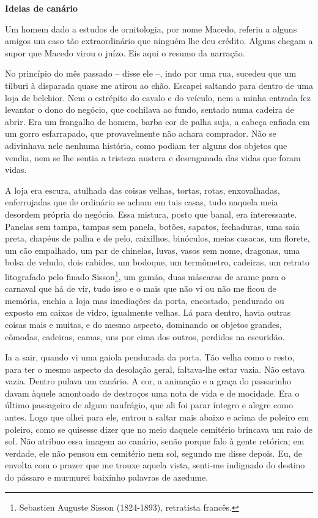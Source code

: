 \textbf{Ideias de canário}

Um homem dado a estudos de ornitologia, por nome Macedo, referiu a
alguns amigos um caso tão extraordinário que ninguém lhe deu crédito.
Alguns chegam a supor que Macedo virou o juízo. Eis aqui o resumo da
narração.

No princípio do mês passado -- disse ele --, indo por uma rua, sucedeu
que um tílburi à disparada quase me atirou ao chão. Escapei saltando
para dentro de uma loja de belchior. Nem o estrépito do cavalo e do
veículo, nem a minha entrada fez levantar o dono do negócio, que
cochilava ao fundo, sentado numa cadeira de abrir. Era um frangalho de
homem, barba cor de palha suja, a cabeça enfiada em um gorro
esfarrapado, que provavelmente não achara comprador. Não se adivinhava
nele nenhuma história, como podiam ter alguns dos objetos que vendia,
nem se lhe sentia a tristeza austera e desenganada das vidas que foram
vidas.

A loja era escura, atulhada das coisas velhas, tortas, rotas,
enxovalhadas, enferrujadas que de ordinário se acham em tais casas, tudo
naquela meia desordem própria do negócio. Essa mistura, posto que banal,
era interessante. Panelas sem tampa, tampas sem panela, botões, sapatos,
fechaduras, uma saia preta, chapéus de palha e de pelo, caixilhos,
binóculos, meias casacas, um florete, um cão empalhado, um par de
chinelas, luvas, vasos sem nome, dragonas, uma bolsa de veludo, dois
cabides, um bodoque, um termômetro, cadeiras, um retrato litografado
pelo finado Sisson\footnote{Sebastien Auguste Sisson (1824-1893),
  retratista francês.}, um gamão, duas máscaras de arame para o carnaval
que há de vir, tudo isso e o mais que não vi ou não me ficou de memória,
enchia a loja mas imediações da porta, encostado, pendurado ou exposto
em caixas de vidro, igualmente velhas. Lá para dentro, havia outras
coisas mais e muitas, e do mesmo aspecto, dominando os objetos grandes,
cômodas, cadeiras, camas, uns por cima dos outros, perdidos na
escuridão.

Ia a sair, quando vi uma gaiola pendurada da porta. Tão velha como o
resto, para ter o mesmo aspecto da desolação geral, faltava-lhe estar
vazia. Não estava vazia. Dentro pulava um canário. A cor, a animação e a
graça do passarinho davam àquele amontoado de destroços uma nota de vida
e de mocidade. Era o último passageiro de algum naufrágio, que ali foi
parar íntegro e alegre como antes. Logo que olhei para ele, entrou a
saltar mais abaixo e acima de poleiro em poleiro, como se quisesse dizer
que no meio daquele cemitério brincava um raio de sol. Não atribuo essa
imagem ao canário, senão porque falo à gente retórica; em verdade, ele
não pensou em cemitério nem sol, segundo me disse depois. Eu, de envolta
com o prazer que me trouxe aquela vista, senti-me indignado do destino
do pássaro e murmurei baixinho palavras de azedume.


